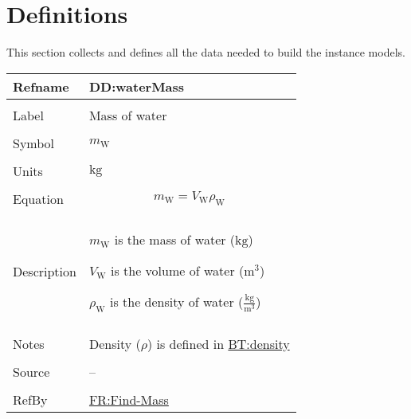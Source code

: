 \documentclass[12pt]{article}
\begin{document}

\section{Definitions}
\label{Sec:DDs}
This section collects and defines all the data needed to build the instance models.

\vspace{\baselineskip}
\noindent
\begin{minipage}{\textwidth}
\begin{tabular}{>{\raggedright}p{}>{\raggedright\arraybackslash}p{}}
\toprule \textbf{Refname} & \textbf{DD:waterMass}
\label{DD:waterMass}
\\ \midrule \\
Label & Mass of water
        
\\ \midrule \\
Symbol & ${m_{\text{W}}}$
         
\\ \midrule \\
Units & ${\text{kg}}$
        
\\ \midrule \\
Equation & \begin{displaymath}
           {m_{\text{W}}}={V_{\text{W}}} {ρ_{\text{W}}}
           \end{displaymath}
\\ \midrule \\
Description & \begin{symbDescription}
              \item{${m_{\text{W}}}$ is the mass of water (${\text{kg}}$)}
              \item{${V_{\text{W}}}$ is the volume of water (${\text{m}^{3}}$)}
              \item{${ρ_{\text{W}}}$ is the density of water ($\frac{\text{kg}}{\text{m}^{3}}$)}
              \end{symbDescription}
\\ \midrule \\
Notes & Density ($ρ$) is defined in \hyperref[BT:density]{BT:density}
\\ \midrule \\
Source & --
         
\\ \midrule \\
RefBy & \hyperref[findMass]{FR:Find-Mass}
        
\\ \bottomrule
\end{tabular}
\end{minipage}
\end{document}
